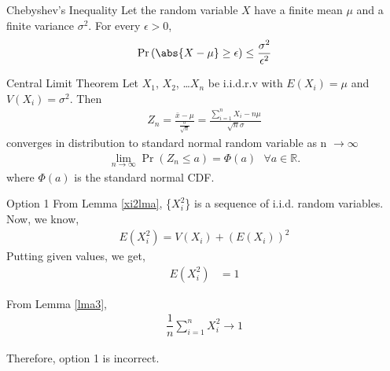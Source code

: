 \documentclass{beamer}
\providecommand{\pr}[1]{\ensuremath{\Pr\left(#1\right)}}
\begin{document}
\begin{frame}{}
\begin{block}{Chebyshev's Inequality}\label{lma4}
   Let the random variable $X$ have a finite mean $\mu$ and a finite variance $\sigma^2$. For every $\epsilon>0$, 
\begin{align}
    \pr{\abs{X - \mu} \geq \epsilon} \leq \frac{\sigma^2}{\epsilon^2}
\end{align}
\end{block}
\end{frame}
\begin{frame}
\begin{block}{Central Limit Theorem}\label{lma2}
Let $X_1$, $X_2$, \ldots $X_n$ be i.i.d.r.v with $E(X_i)=\mu$  and $V(X_i)=\sigma^2$. Then
\begin{align}
    Z_n = \frac{\bar{x} - \mu}{\frac{\sigma}{\sqrt{n}}} = \frac{\sum_{i=1}^n X_i - n\mu}{\sqrt{n}\sigma}
\end{align}
converges in distribution to standard normal random variable as n $\to \infty$
\begin{align}
    \lim_{n \to \infty}\pr{Z_n \leq a} = \Phi(a)   \text{        }\forall a \in \mathbb{R}.
\end{align}
where $\Phi(a)$ is the standard normal CDF.
\end{block}
\end{frame}
\begin{frame}{Option 1}
From Lemma \ref{xi2lma}, \{$X_i^2$\} is a sequence of i.i.d. random variables.
Now, we know,
\begin{align}
    E(X_i^2)=V(X_i)+(E(X_i))^2
\end{align}
Putting given values, we get,
\begin{align} 
    E(X_i^2)&=1 \label{muval}
\end{align}

From Lemma \ref{lma3},  
\begin{align} \label{opt4}
   \dfrac{1}{n}\sum_{i=1}^n X_i^2 \to 1
\end{align}

Therefore, option 1 is incorrect.
\end{frame}
\end{document}
